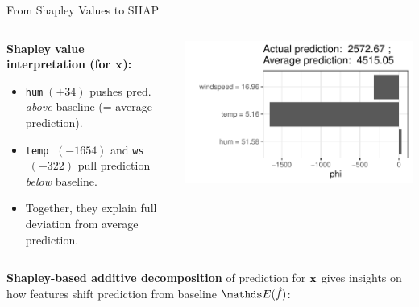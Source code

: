 \documentclass[10pt,compress,t,notes=noshow, xcolor=table]{beamer}
\begin{document}
\begin{frame}{From Shapley Values to SHAP}


\begin{columns}[T, onlytextwidth]
\begin{column}{0.51\textwidth}




\textbf{Shapley value interpretation (for $\mathbf{x}$):}
\begin{itemize}
  \item \texttt{hum}\(\;(+34)\) pushes pred. \emph{above} baseline (= average prediction).  
  \item \texttt{temp} \(\;(-1654)\) and \texttt{ws} \(\;(-322)\) pull prediction \emph{below} baseline.
  \item Together, they explain full deviation from average prediction.
\end{itemize}




\end{column}
\begin{column}{0.49\textwidth}
\includegraphics[trim={10 17 5 5},clip, width=\linewidth]{figure/shapley2shap.pdf}
\end{column}
\end{columns}
\pause
\textbf{Shapley-based additive decomposition} of prediction for $\mathbf{x}$ gives insights on how features shift prediction from baseline $\E(\fh)$:


\end{frame}
\end{document}
